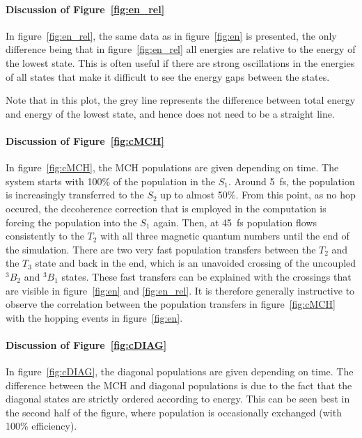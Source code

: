 \documentclass[a4paper,11pt,DIV=15,openany]{scrbook}
\begin{document}
\paragraph{Discussion of Figure~\ref{fig:en_rel}}

In figure~\ref{fig:en_rel}, the same data as in figure~\ref{fig:en} is presented, the only difference being that in figure~\ref{fig:en_rel} all energies are relative to the energy of the lowest state.
This is often useful if there are strong oscillations in the energies of all states that make it difficult to see the energy gaps between the states.

Note that in this plot, the grey line represents the difference between total energy and energy of the lowest state, and hence does not need to be a straight line.

\paragraph{Discussion of Figure~\ref{fig:cMCH}}

In figure~\ref{fig:cMCH}, the MCH populations are given depending on time. 
The system starts with 100\% of the population in the $S_1$. 
Around 5~fs, the population is increasingly transferred to the $S_2$ up to almost 50\%. 
From this point, as no hop occured, the decoherence correction that is employed in the computation is forcing the population into the $S_1$ again.
Then, at 45~fs population flows consistently to the $T_2$ with all three magnetic quantum numbers until the end of the simulation. 
There are two very fast population transfers between the $T_2$ and the $T_3$ state and back in the end, which is an unavoided crossing of the uncoupled ${}^3B_2$ and ${}^3B_1$ states. 
These fast transfers can be explained with the crossings that are visible in figure~\ref{fig:en} and \ref{fig:en_rel}.
It is therefore generally instructive to observe the correlation between the population transfers in figure~\ref{fig:cMCH} with the hopping events in figure~\ref{fig:en}.


\paragraph{Discussion of Figure~\ref{fig:cDIAG}}

In figure~\ref{fig:cDIAG}, the diagonal populations are given depending on time. 
The difference between the MCH and diagonal populations is due to the fact that the diagonal states are strictly ordered according to energy.
This can be seen best in the second half of the figure, where population is occasionally exchanged (with 100\% efficiency).
\end{document}
